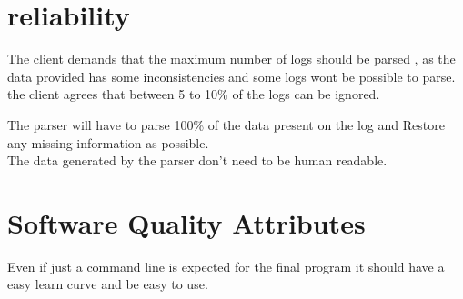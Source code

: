 \documentclass{scrreprt}
\begin{document}
\section{reliability}
The client demands that the maximum number of logs should be parsed , as the
data provided has some inconsistencies and some logs wont be possible to parse.
the client agrees that between  5 to 10\% of the logs can be ignored.

The parser will have to parse 100\% of the data present on the log and Restore
any missing information as possible.\\

The data generated by the parser don't need to be human readable.\\

\section{Software Quality Attributes}
Even if just a command line is expected for the final program it should have a
easy learn curve and be easy to use.



\end{document}
